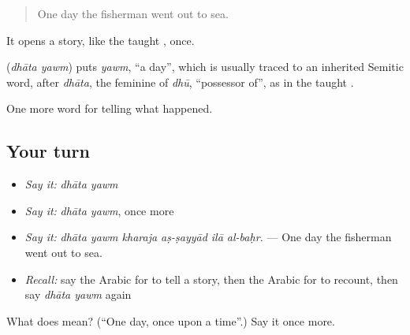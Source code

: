\begin{quote}
One day the fisherman went out to sea.
\end{quote}

It opens a story, like the taught  , once.

\begin{cousinweb}
\textbf{ } (\emph{dhāta yawm}) puts \emph{yawm}, \textquotedblleft{}a day\textquotedblright{}, which is usually traced to an inherited Semitic word, after \emph{dhāta}, the feminine of \emph{dhū}, \textquotedblleft{}possessor of\textquotedblright{}, as in the taught  .
\end{cousinweb}

\begin{grammarlens}[title={What you've built}]
One more word for telling what happened.
\end{grammarlens}

\subsection*{Your turn}
\begin{itemize}
\raggedright
  \item \emph{Say it:} \emph{dhāta yawm}
  \item \emph{Say it:} \emph{dhāta yawm}, once more
  \item \emph{Say it:} \emph{dhāta yawm kharaja aṣ-ṣayyād ilā al-baḥr.} — One day the fisherman went out to sea.
  \item \emph{Recall:} say the Arabic for to tell a story, then the Arabic for to recount, then say \emph{dhāta yawm} again
\end{itemize}

\begin{tcolorbox}[breakable,colback=teal!4,colframe=teal!35!black,title={Before you move on}]
What does   mean? (\textquotedblleft{}One day, once upon a time\textquotedblright{}.) Say it once more.
\end{tcolorbox}
